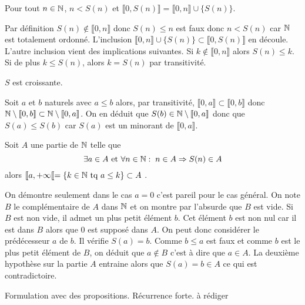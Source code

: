 \begin{lemn}\label{lN: 0S(n)}
 Pour tout $n\in \mathbb{N}$, $n<S(n)$ et $\llbracket 0 , S(n) \rrbracket = \llbracket 0 , n \rrbracket \cup \{S(n)\}$.  
\end{lemn}
\begin{demo}
Par définition $S(n)\notin \llbracket 0,n \rrbracket$ donc $S(n)\leq n$ est faux donc $n <S(n)$ car $\mathbb{N}$ est totalement ordonné.\newline
 L'inclusion $\llbracket 0 , n \rrbracket \cup \{S(n)\} \subset \llbracket 0 , S(n) \rrbracket$ en découle. L'autre inclusion vient des implications suivantes. Si $k\notin \llbracket 0 , n \rrbracket$ alors $S(n)\leq k$. Si de plus $k\leq S(n)$, alors $k=S(n)$ par transitivité.
\end{demo}

\begin{lemn}\label{lN: SCr}
 $S$ est croissante.
\end{lemn}
\begin{demo}
 Soit $a$ et $b$ naturels avec $a\leq b$ alors, par transitivité, $\llbracket 0, a\rrbracket\subset \llbracket 0, b\rrbracket$ donc $\mathbb{N} \setminus \llbracket 0, b\rrbracket \subset \mathbb{N} \setminus \llbracket 0, a\rrbracket$. On en déduit que $S(b)\in \mathbb{N} \setminus \llbracket 0, a\rrbracket$ donc que $S(a)\leq S(b)$ car $S(a)$ est un minorant de $\llbracket 0, a\rrbracket$.
\end{demo}

\begin{prop}
 Soit $A$ une partie de $\mathbb{N}$ telle que
\begin{displaymath}
 \exists a \in A \text{ et } \forall n \in \mathbb{N} :\; n\in A \Rightarrow S(n) \in A
\end{displaymath}
alors $\llbracket a , +\infty\llbracket =\left\lbrace k\in \mathbb{N} \text{ tq } a\leq k\right\rbrace \subset A$ .
\end{prop}
\begin{demo}
 On démontre seulement dans le cas $a=0$ c'est pareil pour le cas général. On note $B$ le complémentaire de $A$ dans $\mathbb{N}$ et on montre par l'absurde que $B$ est vide.\newline
Si $B$ est non vide, il admet un plus petit élément $b$. Cet élément $b$ est non nul car il est dans $B$ alors que $0$ est supposé dans $A$. On peut donc considérer le prédécesseur $a$ de $b$. Il vérifie $S(a) = b$. Comme $b\leq a$ est faux et comme $b$ est le plus petit élément de $B$, on déduit que $a\not\in B$ c'est à dire que $a\in A$. La deuxième hypothèse sur la partie $A$ entraine alors que $S(a)=b\in A$ ce qui est contradictoire.
\end{demo}
Formulation avec des propositions. Récurrence forte. à rédiger

